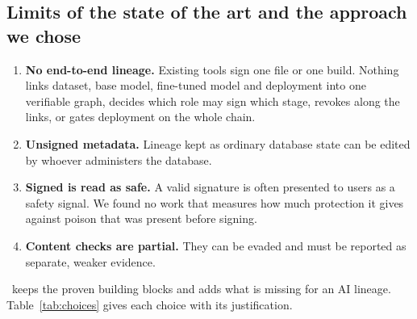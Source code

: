 \subsection{Limits of the state of the art and the approach we chose}
\begin{enumerate}
\item \textbf{No end-to-end lineage.} Existing tools sign one file or one build. Nothing links dataset, base
  model, fine-tuned model and deployment into one verifiable graph, decides which role may sign which stage,
  revokes along the links, or gates deployment on the whole chain.
\item \textbf{Unsigned metadata.} Lineage kept as ordinary database state can be edited by whoever
  administers the database.
\item \textbf{Signed is read as safe.} A valid signature is often presented to users as a safety signal. We
  found no work that measures how much protection it gives against poison that was present before signing.
\item \textbf{Content checks are partial.} They can be evaded and must be reported as separate, weaker
  evidence.
\end{enumerate}

\sys\ keeps the proven building blocks and adds what is missing for an AI lineage. Table~\ref{tab:choices}
gives each choice with its justification.


